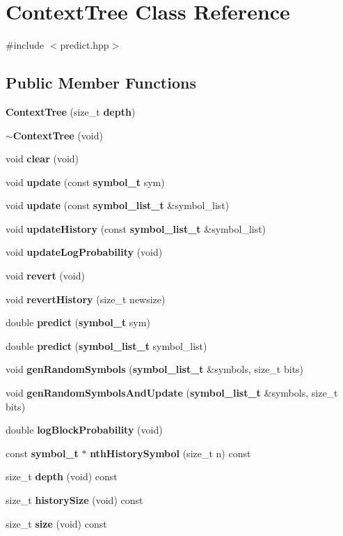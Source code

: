 \section{Context\+Tree Class Reference}
\label{class_context_tree}


{\ttfamily \#include $<$predict.\+hpp$>$}

\subsection*{Public Member Functions}
\begin{DoxyCompactItemize}
\item 
{\bf Context\+Tree} (size\+\_\+t {\bf depth})
\item 
{\bf $\sim$\+Context\+Tree} (void)
\item 
void {\bf clear} (void)
\item 
void {\bf update} (const {\bf symbol\+\_\+t} sym)
\item 
void {\bf update} (const {\bf symbol\+\_\+list\+\_\+t} \&symbol\+\_\+list)
\item 
void {\bf update\+History} (const {\bf symbol\+\_\+list\+\_\+t} \&symbol\+\_\+list)
\item 
void {\bf update\+Log\+Probability} (void)
\item 
void {\bf revert} (void)
\item 
void {\bf revert\+History} (size\+\_\+t newsize)
\item 
double {\bf predict} ({\bf symbol\+\_\+t} sym)
\item 
double {\bf predict} ({\bf symbol\+\_\+list\+\_\+t} symbol\+\_\+list)
\item 
void {\bf gen\+Random\+Symbols} ({\bf symbol\+\_\+list\+\_\+t} \&symbols, size\+\_\+t bits)
\item 
void {\bf gen\+Random\+Symbols\+And\+Update} ({\bf symbol\+\_\+list\+\_\+t} \&symbols, size\+\_\+t bits)
\item 
double {\bf log\+Block\+Probability} (void)
\item 
const {\bf symbol\+\_\+t} $\ast$ {\bf nth\+History\+Symbol} (size\+\_\+t n) const 
\item 
size\+\_\+t {\bf depth} (void) const 
\item 
size\+\_\+t {\bf history\+Size} (void) const 
\item 
size\+\_\+t {\bf size} (void) const 
\end{DoxyCompactItemize}



